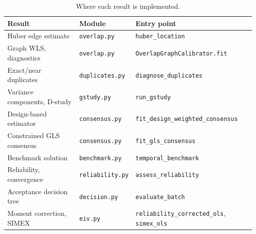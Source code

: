 \documentclass[12pt,a4paper,oneside]{article}
\begin{document}
\begin{table}[H]
\centering
\small
\caption{Where each result is implemented.}
\begin{tabularx}{\textwidth}{llX}
\toprule
Result & Module & Entry point\\
\midrule
Huber edge estimate & \texttt{overlap.py} & \texttt{huber\_location}\\
Graph WLS, diagnostics & \texttt{overlap.py} & \texttt{OverlapGraphCalibrator.fit}\\
Exact/near duplicates & \texttt{duplicates.py} & \texttt{diagnose\_duplicates}\\
Variance components, D-study & \texttt{gstudy.py} & \texttt{run\_gstudy}\\
Design-based estimator & \texttt{consensus.py} & \texttt{fit\_design\_weighted\_consensus}\\
Constrained GLS consensus & \texttt{consensus.py} & \texttt{fit\_gls\_consensus}\\
Benchmark solution & \texttt{benchmark.py} & \texttt{temporal\_benchmark}\\
Reliability, convergence & \texttt{reliability.py} & \texttt{assess\_reliability}\\
Acceptance decision tree & \texttt{decision.py} & \texttt{evaluate\_batch}\\
Moment correction, SIMEX & \texttt{eiv.py} & \texttt{reliability\_corrected\_ols}, \texttt{simex\_ols}\\
\bottomrule
\end{tabularx}
\end{table}
\end{document}
